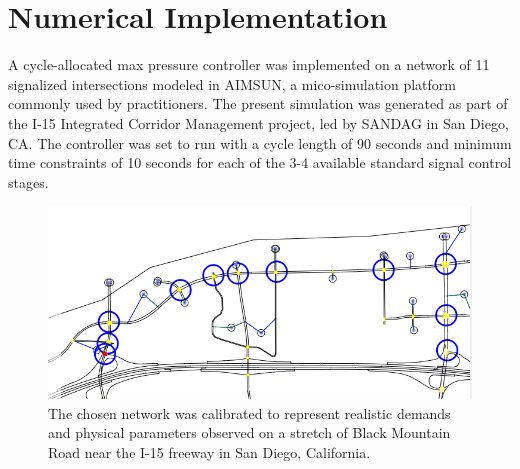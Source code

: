 \section{Numerical Implementation}
A cycle-allocated max pressure controller was implemented on a network of 11 signalized intersections modeled in AIMSUN, a mico-simulation platform commonly used by practitioners. The present simulation was generated as part of the I-15 Integrated Corridor Management project, led by SANDAG in San Diego, CA. 
The controller was set to run with a cycle length of 90 seconds and minimum time constraints of 10 seconds for each of the 3-4 available standard signal control stages.  
\begin{figure}[h!]
\vspace{-.2em}
\centering
\includegraphics[width=.8\columnwidth]{./i15network.png}
\caption{The chosen network was calibrated to represent realistic demands and physical parameters observed on a stretch of Black Mountain Road near the I-15 freeway in San Diego, California.}
\end{figure}

